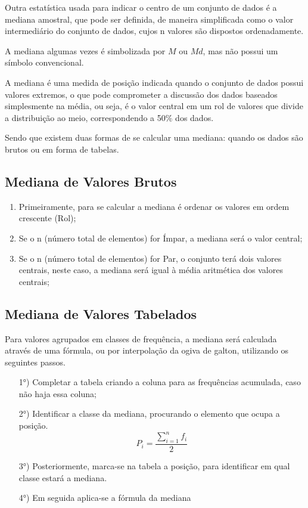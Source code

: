 \inic Outra estatística usada para indicar o centro de um conjunto de dados é a mediana amostral, que pode ser definida, de maneira simplificada como o valor intermediário do conjunto de dados, cujos n valores são dispostos ordenadamente.\vskip0.3cm


A mediana algumas vezes é simbolizada por $M$ ou $Md$, mas não possui um símbolo convencional.\vskip0.3cm



A mediana é uma medida de posição indicada quando o conjunto de dados possui valores extremos,
o que pode comprometer a discussão dos dados baseados simplesmente na média, ou seja, é o
valor central em um rol de valores que divide a distribuição ao meio, correspondendo a 50\% dos dados.\vskip0.3cm

Sendo que existem duas formas de se calcular uma mediana: quando os dados são brutos ou em forma de tabelas.\vskip0.3cm


\subsection{Mediana de Valores Brutos}


\begin{enumerate}
  \item Primeiramente, para se calcular a mediana é ordenar os valores em ordem crescente (Rol);
  \item Se o n (número total de elementos) for Ímpar, a mediana será o valor central;
  \item Se o n (número total de elementos) for Par, o conjunto terá dois valores centrais, neste caso, a mediana será igual à média aritmética dos valores centrais;
\end{enumerate}

\subsection{Mediana de Valores Tabelados}


Para valores agrupados em classes de frequência, a mediana será calculada através de uma fórmula, ou por interpolação da ogiva de galton, utilizando os seguintes passos.



\begin{enumerate}
\item [{1°)}] Completar a tabela criando a coluna para as frequências acumulada, caso não haja essa coluna;
\item [{2°)}]Identificar a classe da mediana, procurando o elemento que ocupa a posição.
$$ P_{i}=\frac{\sum_{i=1}^{n}f_{i}}{2}$$
\item [{3°)}] Posteriormente, marca-se na tabela a posição, para identificar em qual classe estará a mediana.
\item [{4°)}] Em seguida aplica-se a fórmula da mediana
\end{enumerate}

